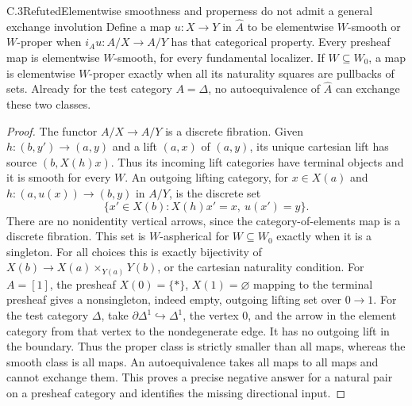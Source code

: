 \begin{claim}{C.3}{Refuted}{Elementwise smoothness and properness do not admit a general exchange involution}
Define a map $u:X\to Y$ in $\widehat A$ to be elementwise $W$-smooth
or $W$-proper when $i_Au:A/X\to A/Y$ has that categorical property.
Every presheaf map is elementwise $W$-smooth, for every fundamental
localizer. If $W\subseteq W_0$, a map is elementwise $W$-proper exactly
when all its naturality squares are pullbacks of sets.
Already for the test category $A=\Delta$, no autoequivalence of
$\widehat A$ can exchange these two classes.
\end{claim}
\begin{proof}
The functor $A/X\to A/Y$ is a discrete fibration. Given
$h:(b,y')\to(a,y)$ and a lift $(a,x)$ of $(a,y)$, its unique cartesian
lift has source $(b,X(h)x)$. Thus its incoming lift categories have
terminal objects and it is smooth for every $W$.
An outgoing lifting category, for $x\in X(a)$ and
$h:(a,u(x))\to(b,y)$ in $A/Y$, is the discrete set
\[
 \{x'\in X(b):X(h)x'=x,\ u(x')=y\}.
\]
There are no nonidentity vertical arrows, since the category-of-elements
map is a discrete fibration. This set is $W$-aspherical for
$W\subseteq W_0$ exactly when it is a singleton. For all choices this
is exactly bijectivity of
$X(b)\to X(a)\times_{Y(a)}Y(b)$, or the cartesian naturality condition.
For $A=[1]$, the presheaf $X(0)=\{*\}$, $X(1)=\varnothing$ mapping
to the terminal presheaf gives a nonsingleton, indeed empty, outgoing
lifting set over $0\to1$. For the test category $\Delta$, take
$\partial\Delta^1\hookrightarrow\Delta^1$, the vertex $0$, and
the arrow in the element category from that vertex to the nondegenerate
edge. It has no outgoing lift in the boundary. Thus the proper class is
strictly smaller than all maps, whereas the smooth class is all maps.
An autoequivalence takes all maps to all maps and cannot exchange them.
This proves a precise negative answer for a natural pair on a presheaf
category and identifies the missing directional input.
\end{proof}

